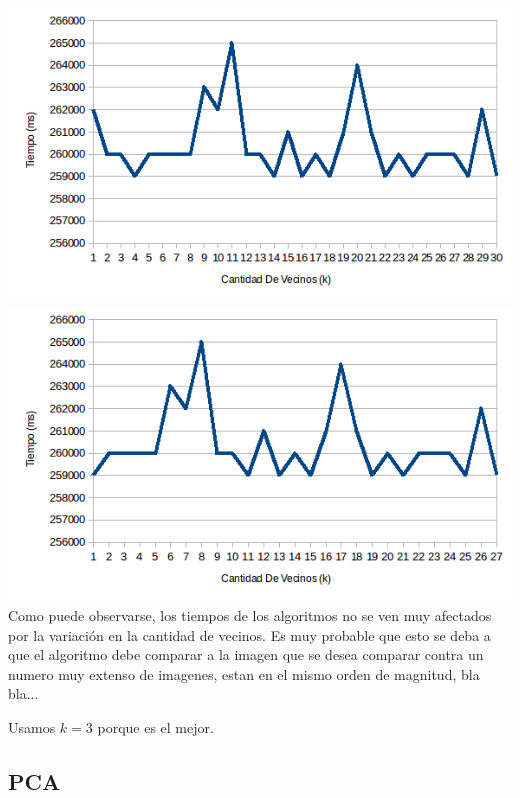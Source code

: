 \includegraphics[scale=0.55]{nuevosResultados/knn/1temp.png}\\

\includegraphics[scale=0.55]{nuevosResultados/knn/2temp.png}\\

Como puede observarse, los tiempos de los algoritmos no se ven muy afectados por la variación en la cantidad de vecinos. Es muy probable que esto se deba a que el algoritmo debe comparar a la imagen que se desea comparar contra un numero muy extenso de imagenes, estan en el mismo orden de magnitud, bla bla...
\completar

Usamos $k=3$ porque es el mejor.

\subsection{PCA}
